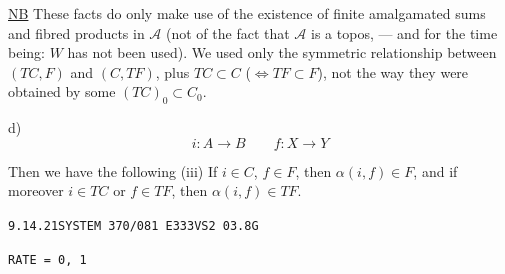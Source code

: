 \uline{NB} These facts do only make use of the existence of finite amalgamated sums and fibred products in $\mathcal A$ (not of the fact that $\mathcal A$ is a topos, --- and for the time being: $W$ has not been used).
We used only the symmetric relationship between  $(TC,F)$ and $(C,TF)$,  plus $TC\subset C$ ($\Leftrightarrow TF\subset F$), not the way they were obtained by some  $(TC)_0\subset C_0$.

d)  
\[
i\colon A\to B\qquad f\colon X\to Y
\]
\qquad{}


Then we have the following 
(iii) If $i\in C$, $f\in F$, then $\alpha(i,f)\in F$, and if moreover $i\in TC$ or $f\in TF$, then $\alpha(i,f)\in TF$.

\texttt{9.14.21\quad SYSTEM 370/081 E333\quad VS2 03.8G}

\texttt{RATE = 0, 1}

